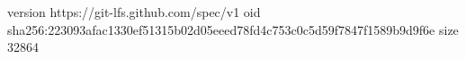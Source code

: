 version https://git-lfs.github.com/spec/v1
oid sha256:223093afac1330ef51315b02d05eeed78fd4c753c0c5d59f7847f1589b9d9f6e
size 32864

